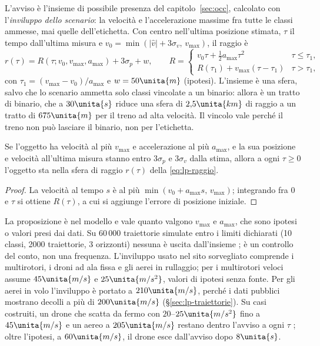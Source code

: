 L'avviso è l'insieme di possibile presenza del capitolo~\ref{sec:occ}, calcolato con l'\emph{inviluppo dello scenario}: la velocità e l'accelerazione massime fra tutte le classi ammesse, mai quelle dell'etichetta. Con centro nell'ultima posizione stimata, $\tau$ il tempo dall'ultima misura e $v_0=\min(|\hat v|+3\sigma_v,\,v_{\max})$, il raggio è
\begin{equation}\label{eq:lp-raggio}
r(\tau)=R(\tau;v_0,v_{\max},a_{\max})+3\sigma_p+w,\qquad
R=\begin{cases} v_0\tau+\tfrac12 a_{\max}\tau^2 & \tau\le\tau_1,\\ R(\tau_1)+v_{\max}(\tau-\tau_1) & \tau>\tau_1,\end{cases}
\end{equation}
con $\tau_1=(v_{\max}-v_0)/a_{\max}$ e $w=50\unita{m}$ (ipotesi). L'insieme è una sfera, salvo che lo scenario ammetta solo classi vincolate a un binario: allora è un tratto di binario, che a $30\unita{s}$ riduce una sfera di $2{,}5\unita{km}$ di raggio a un tratto di $675\unita{m}$ per il treno ad alta velocità. Il vincolo vale perché il treno non può lasciare il binario, non per l'etichetta.

\begin{proposizione}\label{prop:lp-contenimento}
Se l'oggetto ha velocità al più $v_{\max}$ e accelerazione al più $a_{\max}$, e la sua posizione e velocità all'ultima misura stanno entro $3\sigma_p$ e $3\sigma_v$ dalla stima, allora a ogni $\tau\ge0$ l'oggetto sta nella sfera di raggio $r(\tau)$ della \eqref{eq:lp-raggio}.
\end{proposizione}
\begin{proof}
La velocità al tempo $s$ è al più $\min(v_0+a_{\max}s,\,v_{\max})$; integrando fra $0$ e $\tau$ si ottiene $R(\tau)$, a cui si aggiunge l'errore di posizione iniziale.
\end{proof}
La proposizione è  nel modello e vale quanto valgono $v_{\max}$ e $a_{\max}$, che sono ipotesi o valori presi dai dati. Su $60\,000$ traiettorie simulate entro i limiti dichiarati (10 classi, 2000 traiettorie, 3 orizzonti) nessuna è uscita dall'insieme ; è un controllo del conto, non una frequenza. L'inviluppo usato nel sito sorvegliato comprende i multirotori, i droni ad ala fissa e gli aerei in rullaggio; per i multirotori veloci assume $45\unita{m/s}$ e $25\unita{m/s^2}$, valori di ipotesi senza fonte. Per gli aerei in volo l'inviluppo è portato a $210\unita{m/s}$, perché i dati pubblici mostrano decolli a più di $200\unita{m/s}$ (\S\ref{sec:lp-traiettorie}). Su casi costruiti, un drone che scatta da fermo con $20$--$25\unita{m/s^2}$ fino a $45\unita{m/s}$ e un aereo a $205\unita{m/s}$ restano dentro l'avviso a ogni $\tau$ ; oltre l'ipotesi, a $60\unita{m/s}$, il drone esce dall'avviso dopo $8\unita{s}$.

